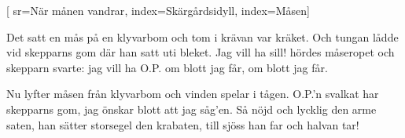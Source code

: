 [				
    sr={När månen vandrar},					
	index={Skärgårdsidyll},
	index={Måsen}]		
	
\beginverse*						
Det satt en mås på en klyvarbom 
och tom i krävan var kräket. 
Och tungan lådde vid skepparns gom 
där han satt uti bleket. 
Jag vill ha sill! 
hördes måseropet 
och skepparn svarte: jag vill ha O.P. 
om blott jag får, om blott jag får.
\endverse						


\beginverse				
Nu lyfter måsen från klyvarbom 
och vinden spelar i tågen. 
O.P.'n svalkat har skepparns gom, 
jag önskar blott att jag såg'en. 
Så nöjd och lycklig den arme saten, 
han sätter storsegel den krabaten, 
till sjöss han far och halvan tar!

\endverse				
\endsong		
